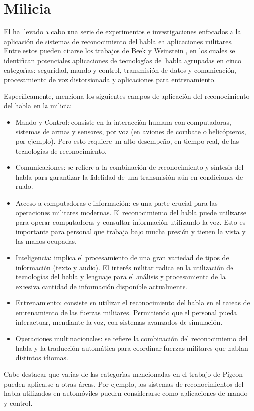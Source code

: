 \section{Milicia}
\label{sec:milicia}

El  ha llevado a cabo una serie de experimentos e investigaciones
enfocados a la aplicaci\'on de sistemas de reconocimiento del habla en aplicaciones militares.
Entre estos pueden citarse los trabajos de Beek \cite{BeekAn1977} y Weinstein \cite{WeinsteinOpportunities1991},
en los cuales se identifican potenciales aplicaciones de tecnolog\'ias del habla agrupadas en cinco categor{\'\i}as:
seguridad, mando y control, transmisi\'on de datos y comunicaci\'on, procesamiento de voz distorsionada
y aplicaciones para entrenamiento.

Espec\'ificamente, \cite{PigeonUse2006} menciona los siguientes campos de aplicaci\'on del reconocimiento 
del habla en la milicia:

\begin{itemize}
    \item Mando y Control: consiste en la interacci\'on humana con computadoras, sistemas
	de armas y sensores, por voz (en aviones de combate o helic\'opteros, por ejemplo). Pero esto
	requiere un alto desempe\~no, en tiempo real, de las tecnolog\'ias de reconocimiento.
	\item Comunicaciones: se refiere a la combinaci\'on de reconocimiento y s{\'\i}ntesis del habla para
	garantizar la fidelidad de una transmisi\'on a\'un en condiciones de ruido.
    \item Acceso a computadoras e informaci\'on: es una parte crucial para las operaciones militares modernas. El
	reconocimiento del habla puede utilizarse para operar computadoras y consultar informaci\'on utilizando la voz.
	Esto es importante para personal que trabaja bajo mucha presi\'on y tienen la vista y las manos ocupadas.
    \item Inteligencia: implica el procesamiento de una gran variedad de tipos de informaci\'on (texto y audio). 
    El inter\'es militar radica en la utilizaci\'on de tecnolog\'ias del habla y lenguaje para el an\'alisis y
    procesamiento de la excesiva cantidad de informaci\'on disponible actualmente.
    \item Entrenamiento: consiste en utilizar el reconocimiento del habla en el tareas de entrenamiento de las fuerzas
	militares. Permitiendo que el personal pueda interactuar, mendiante la voz, con sistemas avanzados de simulaci\'on.
	\item Operaciones multinacionales: se refiere la combinaci\'on del reconocimiento del habla y la traducci\'on
	autom\'atica para coordinar fuerzas militares que hablan distintos idiomas.
\end{itemize}

Cabe destacar que varias de las categor{\'\i}as mencionadas en el trabajo de Pigeon pueden aplicarse
a otras \'areas. Por ejemplo, los sistemas de reconocimientos del habla utilizados en autom\'oviles 
pueden considerarse como aplicaciones de mando y control.
